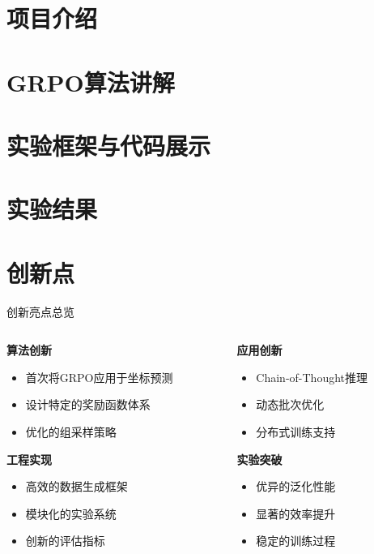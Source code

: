 \section{项目介绍}
\section{GRPO算法讲解}
\section{实验框架与代码展示}
\section{实验结果}
\section{创新点}

\begin{frame}{创新亮点总览}
    \begin{columns}[t]
        \begin{column}{0.48\textwidth}
            \textbf{算法创新}
            \begin{itemize}
                \item 首次将GRPO应用于坐标预测
                \item 设计特定的奖励函数体系
                \item 优化的组采样策略
            \end{itemize}
            \vspace{0.3cm}
            \textbf{工程实现}
            \begin{itemize}
                \item 高效的数据生成框架
                \item 模块化的实验系统
                \item 创新的评估指标
            \end{itemize}
        \end{column}
        \begin{column}{0.48\textwidth}
            \textbf{应用创新}
            \begin{itemize}
                \item Chain-of-Thought推理
                \item 动态批次优化
                \item 分布式训练支持
            \end{itemize}
            \vspace{0.3cm}
            \textbf{实验突破}
            \begin{itemize}
                \item 优异的泛化性能
                \item 显著的效率提升
                \item 稳定的训练过程
            \end{itemize}
        \end{column}
    \end{columns}
\end{frame}

